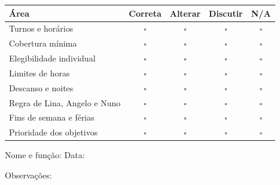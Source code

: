 \documentclass[10pt,a4paper]{article}
\begin{document}
\small
\renewcommand{\arraystretch}{1.35}
\begin{center}
\begin{tabular}{>{\raggedright\arraybackslash}p{}cccc}
\toprule
\textbf{Área} & \textbf{Correta} & \textbf{Alterar} & \textbf{Discutir} & \textbf{N/A} \\
\midrule
Turnos e horários & $\square$ & $\square$ & $\square$ & $\square$ \\
Cobertura mínima & $\square$ & $\square$ & $\square$ & $\square$ \\
Elegibilidade individual & $\square$ & $\square$ & $\square$ & $\square$ \\
Limites de horas & $\square$ & $\square$ & $\square$ & $\square$ \\
Descanso e noites & $\square$ & $\square$ & $\square$ & $\square$ \\
Regra de Lina, Angelo e Nuno & $\square$ & $\square$ & $\square$ & $\square$ \\
Fins de semana e férias & $\square$ & $\square$ & $\square$ & $\square$ \\
Prioridade dos objetivos & $\square$ & $\square$ & $\square$ & $\square$ \\
\bottomrule
\end{tabular}
\end{center}
\normalsize

Nome e função: \hrulefill \hfill Data: \hrulefill

\vspace{0.6cm}
Observações: \hrulefill

\vspace{0.8cm}
\hrulefill
\end{document}
